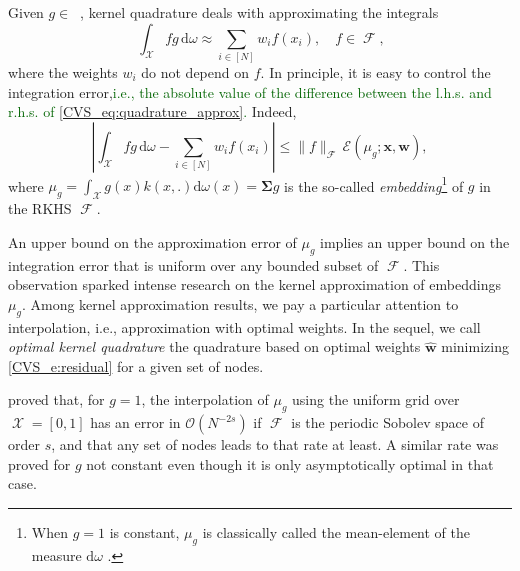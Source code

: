 \documentclass[twoside,11pt]{book}
\newcommand{\rev}[1]{\textcolor{darkgreen}{#1}}
\numberwithin{theorem}{chapter}
\numberwithin{definition}{chapter}
\numberwithin{proposition}{chapter}
\numberwithin{corollary}{chapter}
\numberwithin{example}{chapter}
\numberwithin{lemma}{chapter}
\numberwithin{assumption}{chapter}
\DeclareMathOperator{\F}{\mathcal{F}}
\DeclareMathOperator{\X}{\mathcal{X}}
\DeclareMathOperator{\Ltwo}{\mathbb{L}_{2}(\mathrm{d} \omega)}
\newcommand{\rb}[1]{\textcolor{magenta}{#1}}
\begin{document}
Given $g \in \Ltwo$, kernel quadrature deals with approximating the integrals
\begin{equation}\label{CVS_eq:quadrature_approx}
\:\int_{\X} fg \,\mathrm{d}\omega \approx \sum\limits_{i \in [N]} w_{i}f(x_{i}),\quad f\in\F,
\end{equation}
where the weights $w_{i}$ do not depend on $f$.
In principle, it is easy to control the integration error,\rev{i.e., the absolute value of the difference between the l.h.s. and r.h.s. of \eqref{CVS_eq:quadrature_approx}.} Indeed,
\begin{equation}\label{CVS_eq:upper_bound_integration_error}
\left| \int_{\X} fg \,\mathrm{d}\omega - \sum_{i \in [N]} w_{i}f(x_{i})\right| \leq \|f\|_{\F} \, \mathcal{E}(\mu_{g};\bm{x},\bm{w}),
\end{equation}
where
$ \displaystyle
\mu_{g} = \int_{\X}g(x)k(x,.) \mathrm{d}\omega(x){=\bm{\Sigma} g}
$
is the so-called \emph{embedding}\footnote{When $g =1$ is constant, $\mu_{g}$ is classically called the mean-element of the measure $\mathrm{d} \omega$ \citep{SmGrSoSc07}.} of $g$ in the RKHS $\F$.

An upper bound on the approximation error of $\mu_{g}$ implies an upper bound on the integration error that is uniform over any bounded subset of $\F$. This observation sparked intense research on the kernel approximation of embeddings $\mu_{g}$. Among kernel approximation results, we pay a particular attention to interpolation, i.e., approximation with optimal weights. In the sequel, we call \emph{optimal kernel quadrature} the quadrature based on optimal weights $\hat{\bm{w}}$ minimizing \eqref{CVS_e:residual} for a given set of nodes.

\cite{Boj81} proved that, for $g=1$, the interpolation of $\mu_{g}$ using the uniform grid over $\X = [0,1]$ has an error in $\mathcal{O}(N^{-2s})$ if $\F$ is the periodic Sobolev space of order $s$, and that any set of nodes leads to that rate at least. A similar rate was proved for $g$ not constant \citep{NoUlWo15} even though it is only asymptotically optimal in that case.
\end{document}
